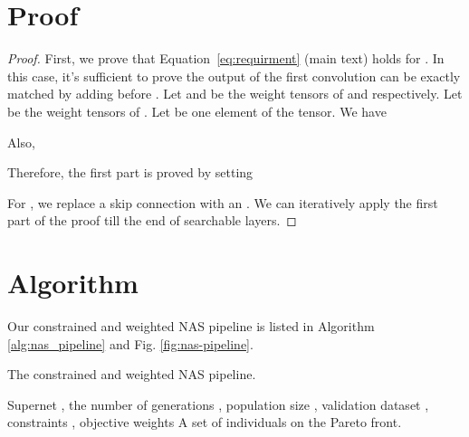 \documentclass[10pt,twocolumn,letterpaper]{article}
\theoremstyle{definition}
\begin{document}
\appendix

\section{Proof}\label{sec:app-proof}

\begin{proof}


	First, we prove that Equation~\ref{eq:requirment} (main text) holds for . In this case, it's sufficient to prove the output of the first convolution  can be exactly matched by adding  before .
	Let  and  be the weight tensors of  and  respectively. Let  be the weight tensors of . Let  be one element of the tensor. We have
	

	Also,
	
Therefore, the first part is proved by setting
		
	For , we replace a skip connection with an . We can iteratively apply the first part of the proof till the end of searchable layers. 
\end{proof}


\section{Algorithm} \label{sec:app-alg}

Our constrained and weighted NAS pipeline is listed in Algorithm \ref{alg:nas_pipeline} and Fig. \ref{fig:nas-pipeline}.

\begin{algorithm}[tb]
	\caption{The constrained and weighted NAS pipeline.}
	\label{alg:nas_pipeline}
	\begin{algorithmic}
		 Supernet , the number of generations , population size , validation dataset , constraints , objective weights 
		 A set of  individuals on the Pareto front.
		
		\STATE{}
		\STATE {}
		\STATE {}
		\WHILE {}
		
		
		\STATE {}
		
		
		\STATE { }
		\IF {}
		\ENDIF
		\IF {}
		\ENDIF
		
		
\ENDWHILE
		
		\ENDFOR
	\end{algorithmic}
\end{algorithm}
\end{document}

